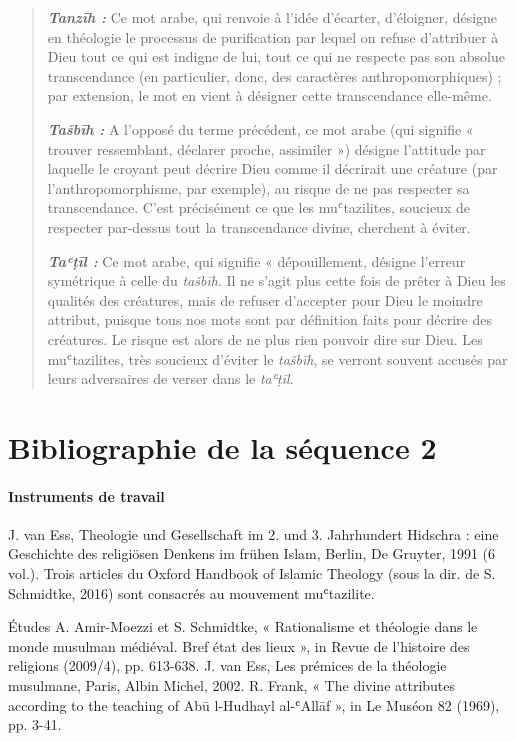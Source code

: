 \begin{quote}
\emph{\textbf{Tanzīh :}} Ce mot arabe, qui renvoie à l'idée d'écarter,
d'éloigner, désigne en théologie le processus de purification par lequel
on refuse d'attribuer à Dieu tout ce qui est indigne de lui, tout ce qui
ne respecte pas son absolue transcendance (en particulier, donc, des
caractères anthropomorphiques) ; par extension, le mot en vient à
désigner cette transcendance elle-même.

\emph{\textbf{Tašbīh :}} A l'opposé du terme précédent, ce mot arabe
(qui signifie « trouver ressemblant, déclarer proche, assimiler »)
désigne l'attitude par laquelle le croyant peut décrire Dieu comme il
décrirait une créature (par l'anthropomorphisme, par exemple), au risque
de ne pas respecter sa transcendance. C'est précisément ce que les
muʿtazilites, soucieux de respecter par-dessus tout la transcendance
divine, cherchent à éviter.

\emph{\textbf{Taʿṭīl :}} Ce mot arabe, qui signifie « dépouillement,
désigne l'erreur symétrique à celle du \emph{tašbīh}. Il ne s'agit plus
cette fois de prêter à Dieu les qualités des créatures, mais de refuser
d'accepter pour Dieu le moindre attribut, puisque tous nos mots sont par
définition faits pour décrire des créatures. Le risque est alors de ne
plus rien pouvoir dire sur Dieu. Les muʿtazilites, très soucieux
d'éviter le \emph{tašbīh}, se verront souvent accusés par leurs
adversaires de verser dans le \emph{taʿṭīl}.
\end{quote}



\section{Bibliographie de la séquence 2}


\paragraph{Instruments de travail}
J. van Ess, Theologie und Gesellschaft im 2. und 3. Jahrhundert Hidschra : eine Geschichte des religiösen Denkens im frühen Islam, Berlin, De Gruyter, 1991 (6 vol.).
Trois articles du Oxford Handbook of Islamic Theology (sous la dir. de S. Schmidtke, 2016) sont
consacrés au mouvement muʿtazilite.


Études
A. Amir-Moezzi et S. Schmidtke, « Rationalisme et théologie dans le monde musulman médiéval. Bref état des lieux », in Revue de l’histoire des religions (2009/4), pp. 613-638.
J. van Ess, Les prémices de la théologie musulmane, Paris, Albin Michel, 2002.
R. Frank, « The divine attributes according to the teaching of Abū l-Hudhayl al-ʿAllāf », in Le Muséon 82 (1969), pp. 3-41.

